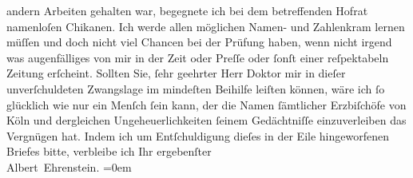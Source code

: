\begin{ledgroupsized}[t]{13cm}
                    andern Arbeiten gehalten war, begegnete ich bei dem betreffenden Hofrat namenloſen
                    Chikanen. Ich werde allen möglichen Namen- und Zahlenkram lernen müſſen und doch
                    nicht viel Chancen bei der Prüfung haben, wenn nicht irgend was augenfälliges
                    von mir in der Zeit oder Preſſe oder ſonſt einer reſpektabeln Zeitung erſcheint.
                    Sollten Sie, {\pb}ſehr geehrter Herr Doktor mir in dieſer
                    unverſchuldeten Zwangslage im mindeſten Beihilfe leiſten können, wäre ich ſo
                    glücklich wie nur ein Menſch ſein kann, der die Namen ſämtlicher Erzbiſchöfe von
                        Köln und dergleichen Ungeheuerlichkeiten
                    ſeinem Gedächtniſſe einzuverleiben das Vergnügen hat.\pend
           \pstart
           Indem ich um Entſchuldigung dieſes in der Eile hingeworfenen Briefes bitte,
                    verbleibe ich\pend
           \pstart
           Ihr ergebenſter{\\[\baselineskip]}\spacefill\mbox{Albert Ehrenstein.}\pend
           \leftskip=0em{}\endnumbering{}\end{ledgroupsized}  \newcommand{\dateiname}{L01852}\newcommand{\titel}{Albert Ehrenstein an Arthur Schnitzler, 1. 7. 1909}\newcommand{\editorInnen}{Martin Anton Müller und Gerd-Hermann Susen}
      
